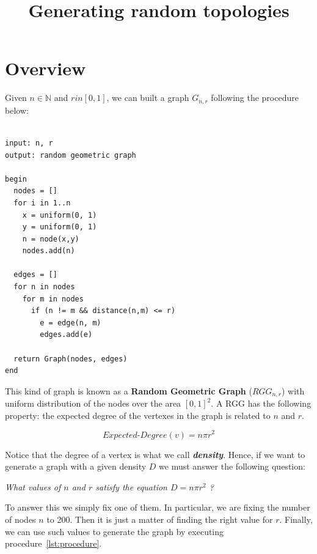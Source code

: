 \documentclass[12pt,a4paper]{report}
\title{Generating random topologies}
\begin{document}

\maketitle

\section{Overview}

Given $n \in \mathbb{N}$ and $r in \left[ 0, 1 \right]$, we can built a graph $G_{n, r}$ following the procedure below:


\lstset{style=customc}

\begin{lstlisting}[label={lst:procedure}, caption="Procedure to generate a random geometric graph"]

input: n, r
output: random geometric graph

begin
  nodes = []
  for i in 1..n
    x = uniform(0, 1)
    y = uniform(0, 1)
    n = node(x,y)
    nodes.add(n)
    
  edges = []
  for n in nodes
    for m in nodes
      if (n != m && distance(n,m) <= r)
        e = edge(n, m)
        edges.add(e)

  return Graph(nodes, edges)
end

\end{lstlisting}

This kind of graph is known as a \textbf{Random Geometric Graph} ($\textit{RGG}_{n,r}$) with uniform distribution of the nodes over the area $[0,1]^2$.
A RGG has the following property: the expected degree of the vertexes in the graph is related to $n$ and $r$.

\[
\textit{Expected-Degree}(v) = n \pi r^2
\]


Notice that the degree of a vertex is what we call \textit{\textbf{density}}. Hence, if we want to generate a graph with a given density $D$ we must answer the following question:

\textit{What values of $n$ and $r$ satisfy the equation $D = n \pi r^2$ ?}

To answer this we simply fix one of them. In particular, we are fixing the number of nodes $n$ to 200. Then it is just a matter of finding the right value for $r$.
Finally, we can use such values to generate the graph by executing procedure~\ref{lst:procedure}.
\end{document}
